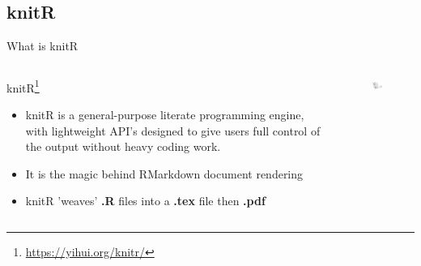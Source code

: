 \documentclass[fleqn]{beamer}\usepackage[]{graphicx}\usepackage[]{color}
\begin{document}
\subsection{knitR}
\begin{frame}{What is knitR}
\begin{columns}[T] %
\begin{column}{.48\textwidth}
knitR\footnote{\href{https://yihui.org/knitr/}{https://yihui.org/knitr/}}
\begin{itemize}
  \item knitR is a general-purpose literate programming engine, with lightweight API's designed to give users full control of the output without heavy coding work.
  \item It is the magic behind RMarkdown document rendering
  \item knitR 'weaves' \textbf{.R} files into a \textbf{.tex} file then \textbf{.pdf}
\end{itemize}
\end{column}%
\hfill%
\begin{column}{.48\textwidth}
\begin{figure}[htp]
    \centering
    \includegraphics[width=4cm]{knit-logo}
\end{figure}
\end{column}%
\end{columns}
\end{frame}
\end{document}
